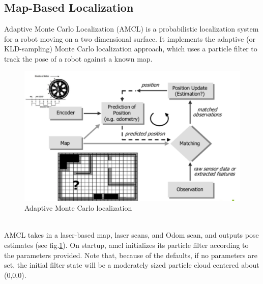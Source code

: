 \subsection{Map-Based Localization\cite{mbl}} %
Adaptive Monte Carlo Localization (AMCL) is a probabilistic localization system for a robot moving on a two dimensional surface. It implements the adaptive (or KLD-sampling) Monte Carlo localization\cite{acml1}\cite{acml2} approach, which uses a particle filter to track the pose of a robot against a known map.
\begin{figure}[!htbp]
	\centering
	\includegraphics[width = 15cm]{Pictures/amcl}
	\caption{Adaptive Monte Carlo localization}
	\label{amcl}
\end{figure}\\
AMCL takes in a laser-based map, laser scans, and Odom scan, and outputs pose estimates (see fig.\ref{amcl}). On startup, amcl initializes its particle filter according to the parameters provided. Note that, because of the defaults, if no parameters are set, the initial filter state will be a moderately sized particle cloud centered about (0,0,0).
\\
